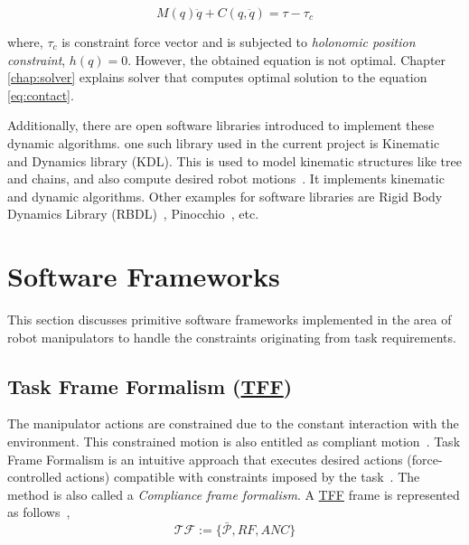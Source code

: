 \begin{equation}\label{eq:contact}
M(q)\ddot{q} + C(q, \ddot{q}) = \tau - \tau_c
\end{equation}

where, $\tau_c$ is constraint force vector and is subjected to \textit{holonomic position constraint}, $h(q) = 0$. However, the obtained equation is not optimal. Chapter \ref{chap:solver} explains solver that computes optimal solution to the equation \ref{eq:contact}.

Additionally, there are open software libraries introduced to implement these dynamic algorithms. one such library used in the current project is Kinematic and Dynamics library (KDL). This is used to model kinematic structures like tree and chains, and also compute desired robot motions~\cite{KDLopensource}. It implements kinematic and dynamic algorithms. Other examples for software libraries are Rigid Body Dynamics Library (RBDL)~\cite{felis2017rbdl}, Pinocchio~\cite{pinocio}, etc.



%

\section{Software Frameworks} \label{sec:software}

This section discusses primitive software frameworks implemented in the area of robot manipulators to handle the constraints originating from task requirements. 

\subsection{Task Frame Formalism (\hyperref[tff]{TFF})}
The manipulator actions are constrained due to the constant interaction with the environment. This constrained motion is also entitled as compliant motion~\cite{kroger2004compliant}. Task Frame Formalism is an intuitive approach that executes desired actions (force-controlled actions) compatible with constraints imposed by the task~\cite{bruyninckx1996specification}. The method is also called a \textit{Compliance frame formalism}. A \hyperref[tff]{TFF} frame is represented as follows~\cite{kroger2004compliant},
\begin{equation}\label{eq:tff}
	\mathcal{TF} := \big\{ \bar{\mathcal{P}}, RF, ANC \big\}
\end{equation}

